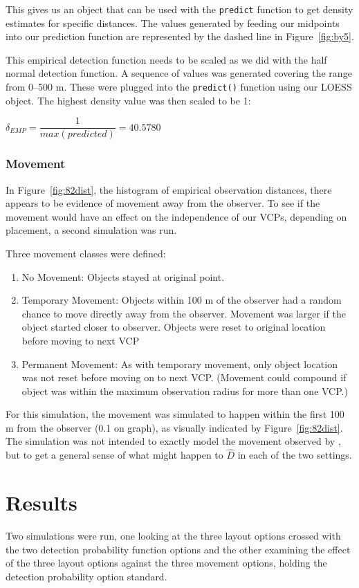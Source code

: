 \documentclass[12pt]{article}
\begin{document}
This gives us an object that can be used with the \texttt{predict} function to get density estimates for specific distances. The values generated by feeding our midpoints into our prediction function are represented by the dashed line in Figure~\ref{fig:by5}. 

This empirical detection function needs to be scaled as we did with the half normal detection function. A sequence of values was generated covering the range from 0--500 m. These were plugged into the \texttt{predict()} function using our LOESS object. The highest density value was then scaled to be 1:

$\delta_{EMP}=\dfrac{1}{max(predicted)}=40.5780$ 

\subsubsection{Movement}
In Figure~\ref{fig:82dist}, the histogram of empirical observation distances, there appears to be evidence of movement away from the observer. To see if the movement would have an effect on the independence of our VCPs, depending on placement, a second simulation was run.

Three movement classes were defined:
\begin{enumerate}
\item No Movement: Objects stayed at original point.
\item Temporary Movement: Objects within 100 m of the observer had a random chance to move directly away from the observer. Movement was larger if the object started closer to observer. Objects were reset to original location before moving to next VCP
\item Permanent Movement: As with temporary movement, only object location was not reset before moving on to next VCP. (Movement could compound if object was within the maximum observation radius for more than one VCP.)
\end{enumerate}

For this simulation, the movement was simulated to happen within the first 100 m from the observer (0.1 on graph), as visually indicated by Figure~\ref{fig:82dist}. The simulation was not intended to exactly model the movement observed by \textcite{micronesian}, but to get a general sense of what might happen to $\hat{D}$ in each of the two settings.

\section{Results}
Two simulations were run, one looking at the three layout options crossed with the two detection probability function options and the other examining the effect of the three layout options against the three movement options, holding the detection probability option standard.
\end{document}
